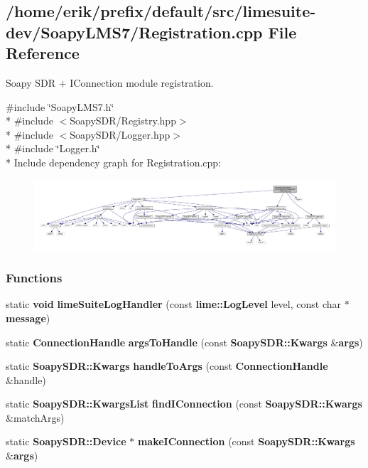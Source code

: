 \subsection{/home/erik/prefix/default/src/limesuite-\/dev/\+Soapy\+L\+M\+S7/\+Registration.cpp File Reference}
\label{Registration_8cpp}


Soapy S\+DR + I\+Connection module registration.  


{\ttfamily \#include \char`\"{}Soapy\+L\+M\+S7.\+h\char`\"{}}\\*
{\ttfamily \#include $<$Soapy\+S\+D\+R/\+Registry.\+hpp$>$}\\*
{\ttfamily \#include $<$Soapy\+S\+D\+R/\+Logger.\+hpp$>$}\\*
{\ttfamily \#include \char`\"{}Logger.\+h\char`\"{}}\\*
Include dependency graph for Registration.\+cpp\+:
\nopagebreak
\begin{figure}[H]
\begin{center}
\leavevmode
\includegraphics[width=350pt]{d1/d0d/Registration_8cpp__incl}
\end{center}
\end{figure}
\subsubsection*{Functions}
\begin{DoxyCompactItemize}
\item 
static {\bf void} {\bf lime\+Suite\+Log\+Handler} (const {\bf lime\+::\+Log\+Level} level, const char $\ast${\bf message})
\item 
static {\bf Connection\+Handle} {\bf args\+To\+Handle} (const {\bf Soapy\+S\+D\+R\+::\+Kwargs} \&{\bf args})
\item 
static {\bf Soapy\+S\+D\+R\+::\+Kwargs} {\bf handle\+To\+Args} (const {\bf Connection\+Handle} \&handle)
\item 
static {\bf Soapy\+S\+D\+R\+::\+Kwargs\+List} {\bf find\+I\+Connection} (const {\bf Soapy\+S\+D\+R\+::\+Kwargs} \&match\+Args)
\item 
static {\bf Soapy\+S\+D\+R\+::\+Device} $\ast$ {\bf make\+I\+Connection} (const {\bf Soapy\+S\+D\+R\+::\+Kwargs} \&{\bf args})
\end{DoxyCompactItemize}
